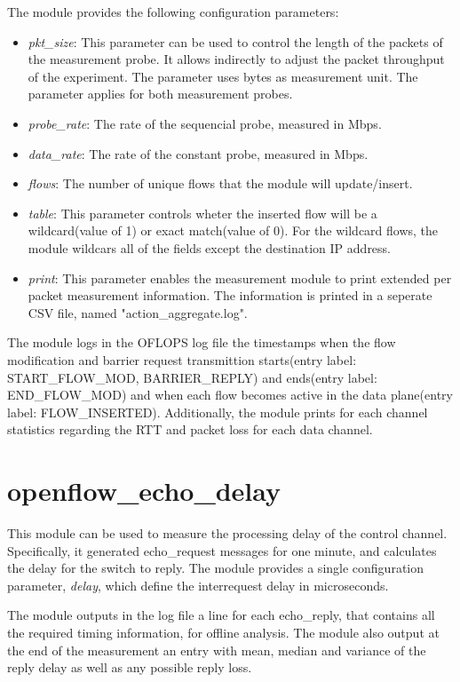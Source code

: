 \documentclass{book}
\begin{document}
The module provides the following configuration parameters: 
\begin{itemize}
\item \emph{pkt\_size}: This parameter can be used to control the length of the
packets of the measurement probe. It allows indirectly to adjust the packet
throughput of the experiment. The parameter uses bytes as measurement unit.
The parameter applies for both measurement probes. 
\item \emph{probe\_rate}: The rate of the sequencial probe, measured in Mbps. 
\item \emph{data\_rate}: The rate of the constant probe, measured in Mbps. 
\item \emph{flows}:  The number of unique flows that the module will
update/insert.
\item \emph{table}:  This parameter controls wheter the inserted flow will be
a wildcard(value of 1) or exact match(value of 0). For the wildcard flows, the
module wildcars all of the fields except the destination IP address. 
\item \emph{print}: This parameter enables the measurement module to print
extended per packet measurement information. The information is printed in a
seperate CSV file, named "action\_aggregate.log".
\end{itemize}

The module logs in the OFLOPS log file the timestamps when the flow
modification and barrier request transmittion starts(entry label:
    START\_FLOW\_MOD, BARRIER\_REPLY) 
and ends(entry label: END\_FLOW\_MOD) and when each flow becomes active in the data 
plane(entry label: FLOW\_INSERTED). Additionally, the module prints for each
channel statistics regarding the RTT and packet loss for each data channel. 

\section{openflow\_echo\_delay}

This module can be used to measure the processing delay of the control channel.
Specifically, it generated echo\_request messages for one minute, and calculates the delay
for the switch to reply. The module provides a single configuration 
parameter, \emph{delay}, which define the interrequest delay in microseconds. 

The module outputs in the log file a line for each echo\_reply, that
contains all the required timing information, for offline analysis. The
module also output at the end of the measurement an entry with mean, median and
variance of the reply delay as well as any possible reply loss. 
\end{document}
